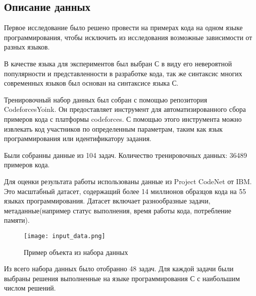 \documentclass[../part_2.tex]{subfiles}
\begin{document}
    \subsection{Описание данных}
    \par Первое исследование было решено провести на примерах кода на одном языке программирования, чтобы исключить из исследования возможные зависимости от разных языков.
    \par В качестве языка для экспериментов был выбран С в виду его невероятной популярности и представленности в разработке кода, так же синтаксис многих современных языков был основан на синтаксисе языка С.
    \par Тренировочный набор данных был собран с помощью репозитория CodeforcesYoink\cite{codeforcesyoink, cfy_text}. Он предоставляет инструмент для автоматизированного сбора примеров кода с платформы codeforces. С помощью этого инструмента можно извлекать код участников по определенным параметрам, таким как язык программирования или идентификатору задания.
    \par Были собранны данные из 104 задач. Количество тренировочных данных: 36489 примеров кода.
    \par Для оценки результата работы использованы данные из Project CodeNet\cite{puri2021codenetlargescaleaicode} от IBM. Это масштабный датасет, содержащий более 14 миллионов образцов кода на 55 языках программирования. Датасет включает разнообразные задачи, метаданные(например статус выполнения, время работы кода, потребление памяти).
    \begin{figure}[H]
        \centering
        \texttt{[image: input\_data.png]}
        \caption{Пример объекта из набора данных}
    \end{figure}
    \par Из всего набора данных было отобранно 48 задач. Для каждой задачи были выбраны решения выполненные на языке программирования С с наибольшим числом решений.
\end{document}
